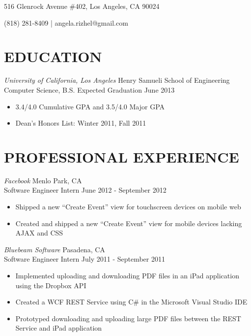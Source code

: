\documentclass{res}
\begin{document}
\thispagestyle{empty} %

\begin{resume}
\centerline{516 Glenrock Avenue \#402, Los Angeles, CA 90024}
\centerline{(818) 281-8409 | angela.rizhel@gmail.com }

\section{EDUCATION}
\vspace{6pt}
{\sl University of California, Los Angeles} \hfill Henry Samueli School of Engineering \\
Computer Science, B.S. \hfill Expected Graduation June 2013

\begin{itemize} \itemsep -2pt %
  \item 3.4/4.0 Cumulative GPA and 3.5/4.0 Major GPA
  \item Dean's Honors List: Winter 2011, Fall 2011
\end{itemize} \vspace{-6pt}

\section{PROFESSIONAL EXPERIENCE}
\vspace{6pt}
  {\sl Facebook} \hfill Menlo Park, CA \\
  Software Engineer Intern \hfill June 2012 - September 2012

 \begin{itemize} \itemsep -2pt %
   \item Shipped a new ``Create Event'' view for touchscreen devices on mobile web
   \item Created and shipped a new ``Create Event'' view for mobile devices lacking AJAX and CSS
 \end{itemize} \vspace{-6pt}

 {\sl Bluebeam Software} \hfill Pasadena, CA \\
 Software Engineer Intern \hfill July 2011 - September 2011

 \begin{itemize} \itemsep -2pt
   \item  Implemented uploading and downloading PDF files in an iPad application using the Dropbox API
   \item Created a WCF REST Service using C\# in the Microsoft Visual Studio IDE
   \item Prototyped downloading and uploading large PDF files between the REST Service and iPad application
 \end{itemize} \vspace{-6pt}


\end{resume}
\end{document}
